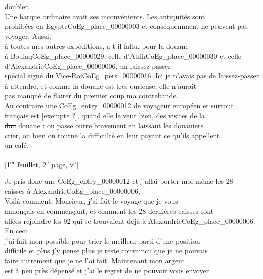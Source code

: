 \documentclass{book}
\begin{document}
doubler.\\
\indent Une barque ordinaire avait ses inconvénients. Les antiquités sont\\
prohibées en Egypte\gls{CoEg_place_00000003} et conséquemment ne peuvent pas voyager. Aussi,\\
à toutes mes autres expéditions, a-t-il fallu, pour la douane\\
à Boulaq\gls{CoEg_place_00000029}, celle d’Atfih\gls{CoEg_place_00000030} et celle d’Alexandrie\gls{CoEg_place_00000006}, un laissez-passer\\
spécial signé du Vice-Roi\gls{CoEg_pers_00000016}. Ici je n’avais pas de laissez-passer\\
à attendre, et comme la douane est très-curieuse, elle n’aurait\\
pas manqué de flairer du premier coup ma contrebande.\\
\indent Au contraire une \gls{CoEg_entry_00000012} de voyageur européen et surtout\\
français est {[exempte ?]}, quand elle le veut bien, des visites de la\\
\sout{dou} douane : on passe outre bravement en laissant les douaniers\\
crier, ou bien on tourne la difficulté en leur payant ce qu’ils appellent\\
un café.
{\footnotesize\begin{center} {[1\textsuperscript{er} feuillet, 2\textsuperscript{e} page, v\textsuperscript{o}]}\end{center}}
\indent Je pris donc une \gls{CoEg_entry_00000012} et j’allai porter moi-même les 28\\
caisses à Alexandrie\gls{CoEg_place_00000006}.\\
\indent Voilà comment, Monsieur, j’ai fait le voyage que je vous\\
annonçais en commençant, et comment les 28 dernières caisses sont\\
allées rejoindre les 92 qui se trouvaient déjà à Alexandrie\gls{CoEg_place_00000006}. En ceci\\
j’ai fait mon possible pour trier le meilleur parti d’une position\\
difficile et plus j’y pense plus je reste convaincu que je ne pouvais\\
faire autrement que je ne l’ai fait. Maintenant mon argent\\
est à peu près dépensé et j’ai le regret de ne pouvoir vous envoyer\\
\end{document}
